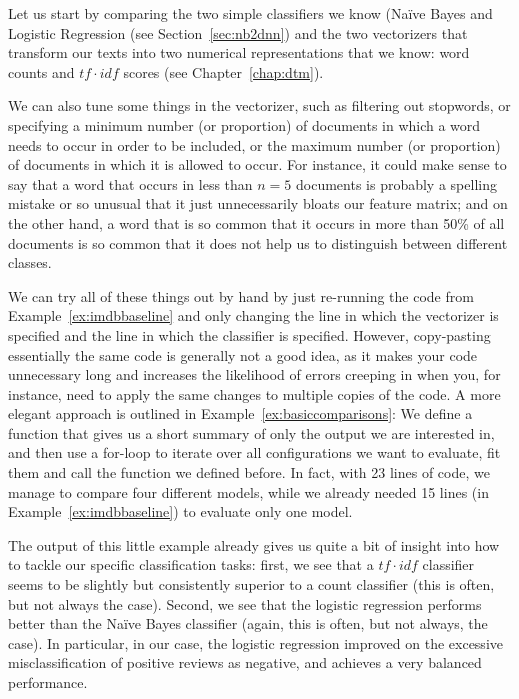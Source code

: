 Let us start by comparing the two simple classifiers we know (Na\"ive
Bayes and Logistic Regression (see Section~\ref{sec:nb2dnn}) and the two
vectorizers that transform our texts into two numerical
representations that we know: word counts and $tf\cdot idf$ scores
(see Chapter~\ref{chap:dtm}).

We can also tune some things in the vectorizer, such as filtering out
stopwords, or specifying a minimum number (or proportion) of documents
in which a word needs to occur in order to be included, or the maximum
number (or proportion) of documents in which it is allowed to
occur. For instance, it could make sense to say that a word that
occurs in less than $n=5$ documents is probably a spelling mistake or
so unusual that it just unnecessarily bloats our feature matrix; and
on the other hand, a word that is so common that it occurs in more
than 50\% of all documents is so common that it does not help us to
distinguish between different classes.

We can try all of these things out by hand by just re-running the code
from Example~\ref{ex:imdbbaseline} and only changing the line in which the
vectorizer is specified and the line in which the classifier is
specified.
However, copy-pasting essentially the
same code is generally not a good idea, as it makes your code unnecessary
long and increases the likelihood of errors creeping in when you, for
instance, need to apply the same changes to multiple copies of the
code.  A more elegant approach is outlined in
Example~\ref{ex:basiccomparisons}: We define a function that gives us a short
summary of only the output we are interested in, and then use a
for-loop to iterate over all configurations we want to evaluate, fit
them and call the function we defined before. In fact, with 23 lines
of code, we manage to compare four different models, while we already
needed 15 lines (in Example~\ref{ex:imdbbaseline}) to evaluate only one model.




The output of this little example already gives us  quite a bit of
insight into how to tackle our specific classification tasks: first, we
see that a $tf\cdot idf$ classifier seems to be slightly but
consistently superior to a count classifier (this is often, but not
always the case). Second, we see that the logistic regression performs
better than the Na\"ive Bayes classifier (again, this is often, but not
always, the case). In particular, in our case, the logistic regression
improved on the excessive misclassification of positive reviews as
negative, and achieves a very balanced performance.

